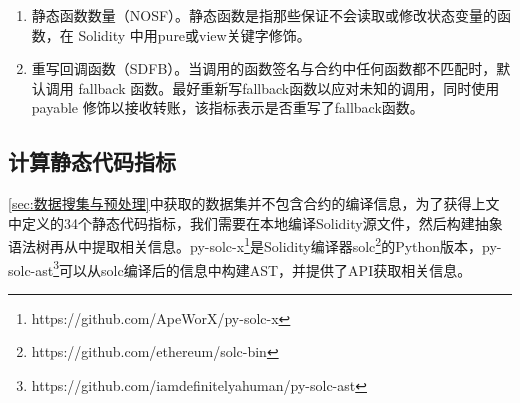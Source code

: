 \begin{enumerate}[label=(\arabic*)]
    \item 静态函数数量（NOSF）。静态函数是指那些保证不会读取或修改状态变量的函数，在 Solidity 中用pure或view关键字修饰。
    \item 重写回调函数（SDFB）。当调用的函数签名与合约中任何函数都不匹配时，默认调用 fallback 函数。最好重新写fallback函数以应对未知的调用，同时使用 payable 修饰以接收转账，该指标表示是否重写了fallback函数。
\end{enumerate}
\subsection{计算静态代码指标}
\label{sec:计算静态代码指标}
\autoref{sec:数据搜集与预处理}中获取的数据集并不包含合约的编译信息，为了获得上文中定义的34个静态代码指标，我们需要在本地编译Solidity源文件，然后构建抽象语法树再从中提取相关信息。py-solc-x\footnote{https://github.com/ApeWorX/py-solc-x}是Solidity编译器solc\footnote{https://github.com/ethereum/solc-bin}的Python版本，py-solc-ast\footnote{https://github.com/iamdefinitelyahuman/py-solc-ast}可以从solc编译后的信息中构建AST，并提供了API获取相关信息。

